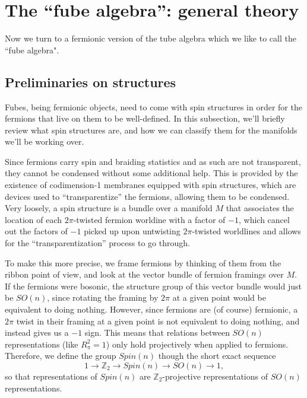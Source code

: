 \documentclass[12pt,a4paper]{article}
\newcommand{\ra}{\rightarrow}
\newcommand{\zt}{\mathbb{Z}_2}
\newcommand\be            {\begin{equation}}
\newcommand\ee            {\end{equation}}
\begin{document}
\section{The ``fube algebra'': general theory}

Now we turn to a fermionic version of the tube algebra which we like to call the ``fube algebra".


\subsection{Preliminaries on structures} 

Fubes, being fermionic objects, need to come with spin structures in order for the fermions that live on them to be well-defined. In this subsection, we'll briefly review what spin structures are, and how we can classify them for the manifolds we'll be working over. 


Since fermions carry spin and braiding statistics and as such are not transparent, they cannot be condensed without some additional help. This is provided by the
existence of codimension-1 membranes equipped with spin structures, which are devices used to %
``transparentize'' the fermions, allowing them to be condensed. 
Very loosely, a spin structure is a bundle over a manifold $M$ that associates the location of each $2\pi$-twisted fermion worldine with a factor of $-1$, which cancel out the factors of $-1$ picked up upon untwisting $2\pi$-twisted worldlines and allows for the ``transparentization'' process to go through. %

To make this more precise, we frame fermions by thinking of them from the ribbon point of view, and look at the vector bundle of fermion framings over $M$. If the fermions were bosonic, the structure group of this vector bundle would just be $SO(n)$, since rotating the framing by $2\pi$ at a given point would be equivalent to doing nothing. However, since fermions are (of course) fermionic, a $2\pi$ twist in their framing at a given point is not equivalent to doing nothing, and instead gives us a $-1$ sign. This means that relations between $SO(n)$ representations (like $R_\pi^2 = 1$) only hold projectively when applied to fermions. Therefore, we define the group $Spin(n)$ though the short exact sequence
\be 1 \ra \zt \ra Spin(n) \ra SO(n) \ra 1,\ee
so that representations of $Spin(n)$ are $\zt$-projective representations of $SO(n)$ representations. 
\end{document}
